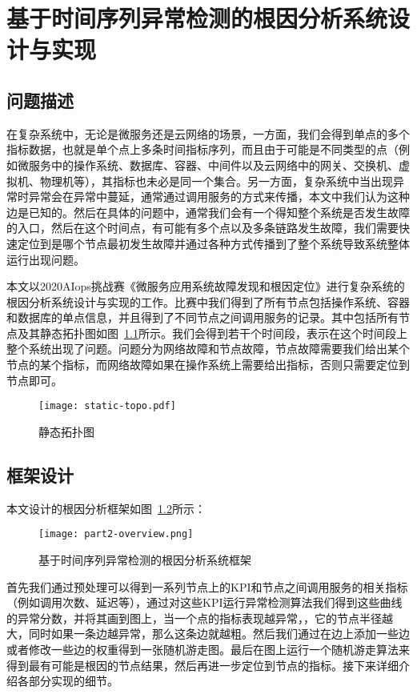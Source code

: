 
\chapter{基于时间序列异常检测的根因分析系统设计与实现}
\label{cha:intro}
\section{问题描述}
在复杂系统中，无论是微服务还是云网络的场景，一方面，我们会得到单点的多个指标数据，也就是单个点上多条时间指标序列，而且由于可能是不同类型的点（例如微服务中的操作系统、数据库、容器、中间件以及云网络中的网关、交换机、虚拟机、物理机等），其指标也未必是同一个集合。另一方面，复杂系统中当出现异常时异常会在异常中蔓延，通常通过调用服务的方式来传播，本文中我们认为这种边是已知的。然后在具体的问题中，通常我们会有一个得知整个系统是否发生故障的入口，然后在这个时间点，有可能有多个点以及多条链路发生故障，我们需要快速定位到是哪个节点最初发生故障并通过各种方式传播到了整个系统导致系统整体运行出现问题。

本文以2020AIops挑战赛《微服务应用系统故障发现和根因定位》进行复杂系统的根因分析系统设计与实现的工作。比赛中我们得到了所有节点包括操作系统、容器和数据库的单点信息，并且得到了不同节点之间调用服务的记录。其中包括所有节点及其静态拓扑图如图~\ref{fig:static_topo}所示。我们会得到若干个时间段，表示在这个时间段上整个系统出现了问题。问题分为网络故障和节点故障，节点故障需要我们给出某个节点的某个指标，而网络故障如果在操作系统上需要给出指标，否则只需要定位到节点即可。

\begin{figure}[htbp]
    \centering
    \texttt{[image: static-topo.pdf]}
    \caption{静态拓扑图}
    \label{fig:static_topo}
  \end{figure}

\section{框架设计}
本文设计的根因分析框架如图~\ref{fig:part2-overview}所示：
\begin{figure}[htbp]
    \centering
    \texttt{[image: part2-overview.png]}
    \caption{基于时间序列异常检测的根因分析系统框架}
    \label{fig:part2-overview}
  \end{figure}

首先我们通过预处理可以得到一系列节点上的KPI和节点之间调用服务的相关指标（例如调用次数、延迟等），通过对这些KPI运行异常检测算法我们得到这些曲线的异常分数，并将其画到图上，当一个点的指标表现越异常，，它的节点半径越大，同时如果一条边越异常，那么这条边就越粗。然后我们通过在边上添加一些边或者修改一些边的权重得到一张随机游走图。最后在图上运行一个随机游走算法来得到最有可能是根因的节点结果，然后再进一步定位到节点的指标。接下来详细介绍各部分实现的细节。
